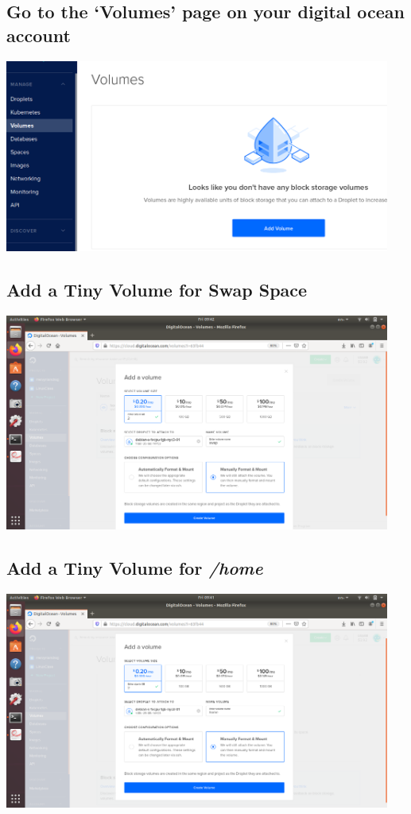 \documentclass[10pt]{article}
\begin{document}
\subsection{Go to the `Volumes' page on your digital ocean account}
\begin{center}
    \includegraphics[width=0.95\textwidth]{Images/00_addVolume.png}
\end{center}

\subsection{Add a Tiny Volume for Swap Space}
\begin{center}
   \includegraphics[width=0.95\textwidth]{Images/01_addSwapVolume.png}
\end{center}

\subsection{Add a Tiny Volume for \textit{/home}}
\begin{center}
    \includegraphics[width=0.95\textwidth]{Images/02_createVolumeHome.png}
\end{center}
\end{document}
